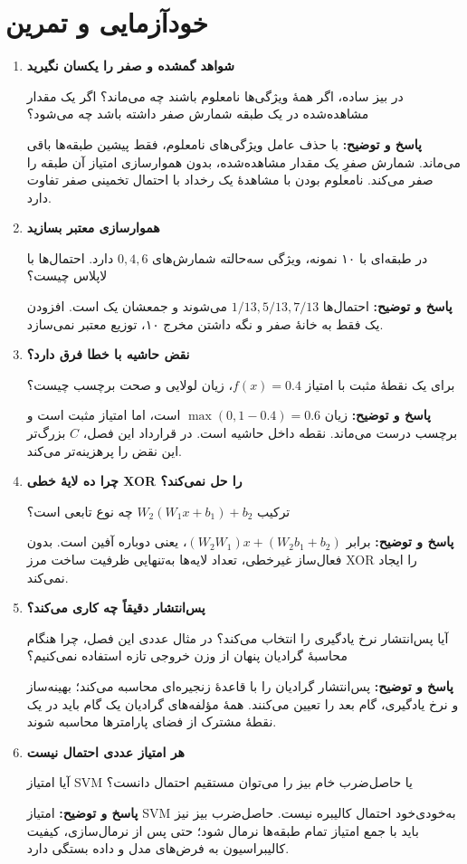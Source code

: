 \documentclass[12pt,a4paper,oneside]{report}
\newcounter{ex}[chapter]
\newenvironment{selftests}{\begin{enumerate}\setlength{\itemsep}{9pt}}{\end{enumerate}}
\newenvironment{selftest}[1]{\item\textbf{#1}\par}{\par}
\newcommand{\answer}[1]{\par{\color{teal}\bfseries پاسخ و توضیح: }#1\par}
\begin{document}
\section{خودآزمایی و تمرین}
\begin{selftests}
\begin{selftest}{شواهد گمشده و صفر را یکسان نگیرید}
در بیز ساده، اگر همهٔ ویژگی‌ها نامعلوم باشند چه می‌ماند؟ اگر یک مقدار مشاهده‌شده در یک طبقه شمارش صفر داشته باشد چه می‌شود؟
\answer{با حذف عامل ویژگی‌های نامعلوم، فقط پیشین طبقه‌ها باقی می‌ماند. شمارش صفرِ یک مقدار مشاهده‌شده، بدون هموارسازی امتیاز آن طبقه را صفر می‌کند. نامعلوم بودن با مشاهدهٔ یک رخداد با احتمال تخمینی صفر تفاوت دارد.}
\end{selftest}
\begin{selftest}{هموارسازی معتبر بسازید}
در طبقه‌ای با ۱۰ نمونه، ویژگی سه‌حالته شمارش‌های $0,4,6$ دارد. احتمال‌ها با لاپلاس چیست؟
\answer{احتمال‌ها $1/13,5/13,7/13$ می‌شوند و جمعشان یک است. افزودن یک فقط به خانهٔ صفر و نگه داشتن مخرج ۱۰، توزیع معتبر نمی‌سازد.}
\end{selftest}
\begin{selftest}{نقض حاشیه با خطا فرق دارد؟}
برای یک نقطهٔ مثبت با امتیاز $f(x)=0.4$، زیان لولایی و صحت برچسب چیست؟
\answer{زیان $\max(0,1-0.4)=0.6$ است، اما امتیاز مثبت است و برچسب درست می‌ماند. نقطه داخل حاشیه است. در قرارداد این فصل، $C$ بزرگ‌تر این نقض را پرهزینه‌تر می‌کند.}
\end{selftest}
\begin{selftest}{چرا ده لایهٔ خطی XOR را حل نمی‌کند؟}
ترکیب $W_2(W_1x+b_1)+b_2$ چه نوع تابعی است؟
\answer{برابر $(W_2W_1)x+(W_2b_1+b_2)$، یعنی دوباره آفین است. بدون فعال‌ساز غیرخطی، تعداد لایه‌ها به‌تنهایی ظرفیت ساخت مرز XOR را ایجاد نمی‌کند.}
\end{selftest}
\begin{selftest}{پس‌انتشار دقیقاً چه کاری می‌کند؟}
آیا پس‌انتشار نرخ یادگیری را انتخاب می‌کند؟ در مثال عددی این فصل، چرا هنگام محاسبهٔ گرادیان پنهان از وزن خروجی تازه استفاده نمی‌کنیم؟
\answer{پس‌انتشار گرادیان را با قاعدهٔ زنجیره‌ای محاسبه می‌کند؛ بهینه‌ساز و نرخ یادگیری، گام بعد را تعیین می‌کنند. همهٔ مؤلفه‌های گرادیان یک گام باید در یک نقطهٔ مشترک از فضای پارامترها محاسبه شوند.}
\end{selftest}
\begin{selftest}{هر امتیاز عددی احتمال نیست}
آیا امتیاز SVM یا حاصل‌ضرب خام بیز را می‌توان مستقیم احتمال دانست؟
\answer{امتیاز SVM به‌خودی‌خود احتمال کالیبره نیست. حاصل‌ضرب بیز نیز باید با جمع امتیاز تمام طبقه‌ها نرمال شود؛ حتی پس از نرمال‌سازی، کیفیت کالیبراسیون به فرض‌های مدل و داده بستگی دارد.}
\end{selftest}
\end{selftests}
\end{document}
